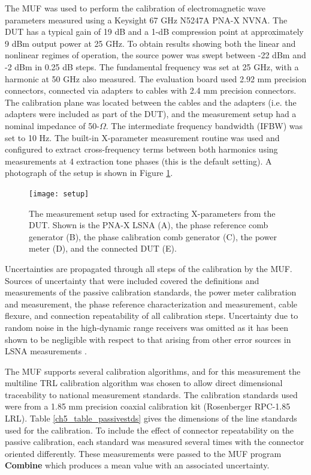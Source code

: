 \documentclass[../thesis/thesis.tex]{subfiles}
\begin{document}
\begin{refsection}
The MUF was used to perform the calibration of electromagnetic wave parameters measured using a Keysight  67 GHz N5247A PNA-X NVNA. The DUT \cite{hittite_amp} has a typical gain of 19 dB and a \mbox{1-dB} compression point at approximately 9 dBm output power at 25 GHz. To obtain results showing both the linear and nonlinear regimes of operation, the source power was swept between -22 dBm and -2 dBm in 0.25 dB steps. The fundamental frequency was set at 25 GHz, with a harmonic at 50 GHz also measured. The evaluation board used 2.92 mm precision connectors, connected via adapters to cables with 2.4 mm precision connectors. The calibration plane was located between the cables and the adapters (i.e. the adapters were included as part of the DUT), and the measurement setup had a nominal impedance of 50-$\Omega$. The intermediate frequency bandwidth (IFBW) was set to 10 Hz. The built-in X-parameter measurement routine was used and configured to extract cross-frequency terms between both harmonics using measurements at 4 extraction tone phases (this is the default setting). A photograph of the setup is shown in Figure \ref{ch5_fig_setup}.

\begin{figure}[t]
	\centering
	\texttt{[image: setup]}
	\caption[The measurement setup used for extracting X-parameters from the DUT.]{The measurement setup used for extracting X-parameters from the DUT. Shown is the PNA-X LSNA (A), the phase reference comb generator (B), the phase calibration comb generator (C), the power meter (D), and the connected DUT (E).}
	\label{ch5_fig_setup}
\end{figure}

Uncertainties are propagated through all steps of the calibration by the MUF. Sources of uncertainty that were included covered the definitions and measurements of the passive calibration standards, the power meter calibration and measurement, the phase reference characterization and measurement, cable flexure, and connection repeatability of all calibration steps. Uncertainty due to random noise in the high-dynamic range receivers was omitted as it has been shown to be negligible with respect to that arising from other error sources in LSNA measurements \cite{Blockley_2007}.

The MUF supports several calibration algorithms, and for this measurement the multiline TRL calibration algorithm \cite{Engen_1979, Marks_1991} was chosen to allow direct dimensional traceability to national measurement standards. The calibration standards used were from a 1.85 mm precision coaxial calibration kit (Rosenberger RPC-1.85 LRL). Table \ref{ch5_table_passivestds} gives the dimensions of the line standards used for the calibration. To include the effect of connector repeatability on the passive calibration, each standard was measured several times with the connector oriented differently. These measurements were passed to the MUF program \textbf{Combine} which produces a mean value with an associated uncertainty.


\end{refsection}
\end{document}
